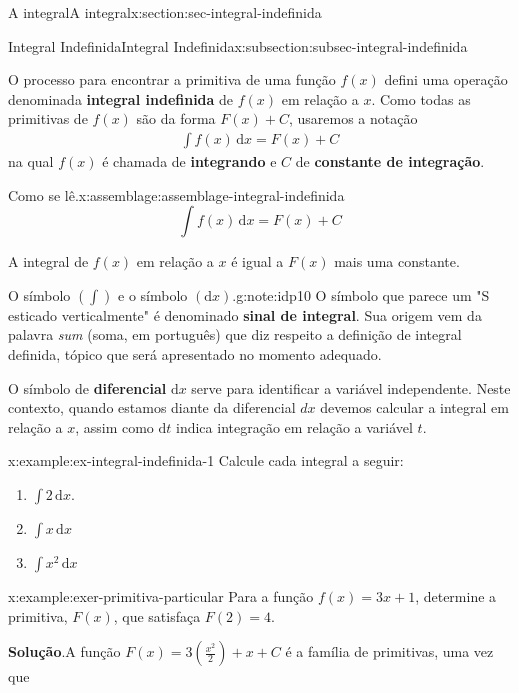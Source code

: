 \documentclass[oneside,10pt,]{article}
\newcommand{\blocktitlefont}{\relax}
\newcommand{\terminology}[1]{\textbf{#1}}
\numberwithin{equation}{section}
\newcommand{\dd}{\mathrm{d}}
\newcommand{\integral}[2]{\displaystyle\int {#1}\,\dd {#2}}
\begin{document}
\begin{sectionptx}{A integral}{}{A integral}{}{}{x:section:sec-integral-indefinida}
\begin{subsectionptx}{Integral Indefinida}{}{Integral Indefinida}{}{}{x:subsection:subsec-integral-indefinida}
\par
O processo para encontrar a primitiva de uma função \(f(x)\) defini uma operação denominada \terminology{integral indefinida}  de \(f(x)\) em relação a \(x\). Como todas as primitivas de \(f(x)\) são da forma \(F(x) + C\), usaremos a notação%
\begin{gather}
\integral{f(x)}{x}=F(x) + C \label{x:mrow:eq-integral-indefinida}
\end{gather}
na qual \(f(x)\) é chamada de \terminology{integrando}  e \(C\)  de \terminology{constante de integração}.%
\begin{assemblage}{Como se lê.}{x:assemblage:assemblage-integral-indefinida}%
%
\begin{equation*}
\integral{f(x)}{x}=F(x) + C
\end{equation*}
%
\par
A integral de \(f(x)\) em relação a \(x\) é igual a \(F(x)\) mais uma constante.%
\end{assemblage}
\begin{note}{O símbolo \((\displaystyle\int)\) e o símbolo \((\dd x)\).}{g:note:idp10}%
O símbolo que parece um "S esticado verticalmente" é denominado \terminology{sinal de integral}. Sua origem vem da palavra \emph{sum} (soma, em português) que diz respeito a definição de integral definida, tópico que será apresentado no momento adequado.%
\par
O símbolo de \terminology{diferencial} \(\dd x\) serve para identificar a variável independente. Neste contexto, quando estamos diante da diferencial \(dx\) devemos calcular a integral em relação a \(x\), assim como \(\dd t\) indica integração em relação a variável \(t\).%
\end{note}
\begin{example}{}{x:example:ex-integral-indefinida-1}%
Calcule cada integral a seguir: \begin{enumerate}[font=\bfseries,label=(\alph*),ref=\alph*]
\item{}\(\integral{2}{x}.\)%
 \item{}\(\integral{x}{x}\)%
 \item{}\(\integral{x^2}{x}\)%
\end{enumerate}
%
\end{example}
\begin{example}{}{x:example:exer-primitiva-particular}%
Para a função \(f(x)=3x+1\), determine a primitiva, \(F(x)\), que satisfaça \(F(2)=4\).%
\par\smallskip%
\noindent\textbf{\blocktitlefont Solução}.\hypertarget{g:solution:idp11}{}\quad{}A função \(F(x)= 3\left(\frac{x^2}{2}\right) + x+ C\) é a família de primitivas, uma vez que%

\end{example}
\end{subsectionptx}
\end{sectionptx}
\end{document}
